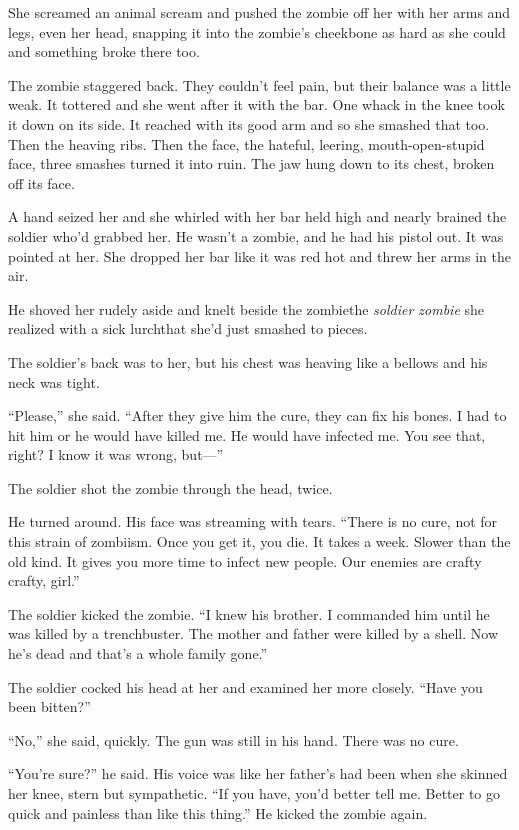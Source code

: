 She screamed an animal scream and pushed the zombie off her with
her arms and legs, even her head, snapping it into the zombie’s
cheekbone as hard as she could and something broke there too.

The zombie staggered back. They couldn’t feel pain, but their
balance was a little weak. It tottered and she went after it with
the bar. One whack in the knee took it down on its side. It reached
with its good arm and so she smashed that too. Then the heaving
ribs. Then the face, the hateful, leering, mouth-open-stupid face,
three smashes turned it into ruin. The jaw hung down to its chest,
broken off its face.

A hand seized her and she whirled with her bar held high and nearly
brained the soldier who’d grabbed her. He wasn’t a zombie, and he
had his pistol out. It was pointed at her. She dropped her bar like
it was red hot and threw her arms in the air.

He shoved her rudely aside and knelt beside the zombie\dash{}the
\emph{soldier zombie} she realized with a sick lurch\dash{}that she’d
just smashed to pieces.

The soldier’s back was to her, but his chest was heaving like a
bellows and his neck was tight.

“Please,” she said. “After they give him the cure, they can fix his
bones. I had to hit him or he would have killed me. He would have
infected me. You see that, right? I know it was wrong, but---”

The soldier shot the zombie through the head, twice.

He turned around. His face was streaming with tears. “There is no
cure, not for this strain of zombiism. Once you get it, you die. It
takes a week. Slower than the old kind. It gives you more time to
infect new people. Our enemies are crafty crafty, girl.”

The soldier kicked the zombie. “I knew his brother. I commanded him
until he was killed by a trenchbuster. The mother and father were
killed by a shell. Now he’s dead and that’s a whole family gone.”

The soldier cocked his head at her and examined her more closely.
“Have you been bitten?”

“No,” she said, quickly. The gun was still in his hand. There was
no cure.

“You’re sure?” he said. His voice was like her father’s had been
when she skinned her knee, stern but sympathetic. “If you have,
you’d better tell me. Better to go quick and painless than like
this thing.” He kicked the zombie again.

